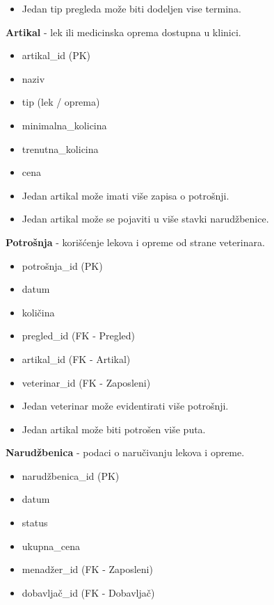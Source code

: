 \begin{itemize}{Veze:}
    \item Jedan tip pregleda može biti dodeljen vise termina. 
\end{itemize}

\indent\textbf{Artikal} - lek ili medicinska oprema dostupna u klinici.
\begin{itemize}{Atributi:}
    \item artikal\_id (PK)
    \item naziv
    \item tip (lek / oprema)
    \item minimalna\_kolicina
    \item trenutna\_kolicina
    \item cena
\end{itemize}

\begin{itemize}{Veze:}
    \item Jedan artikal može imati više zapisa o potrošnji.
    \item Jedan artikal može se pojaviti u više stavki narudžbenice.
\end{itemize}

\indent\textbf{Potrošnja} - korišćenje lekova i opreme od strane veterinara.
\begin{itemize}{Atributi:}
    \item potrošnja\_id (PK)
    \item datum
    \item količina
    \item pregled_id (FK - Pregled)
    \item artikal\_id (FK - Artikal)
    \item veterinar\_id (FK - Zaposleni)
\end{itemize}

\begin{itemize}{Veze:}
    \item Jedan veterinar može evidentirati više potrošnji.
    \item Jedan artikal može biti potrošen više puta.
\end{itemize}

\indent\textbf{Narudžbenica} - podaci o naručivanju lekova i opreme.
\begin{itemize}{Atributi:}
    \item narudžbenica\_id (PK) 
    \item datum
    \item status
    \item ukupna\_cena
    \item menadžer\_id (FK - Zaposleni)
    \item dobavljač\_id (FK - Dobavljač)
\end{itemize}

